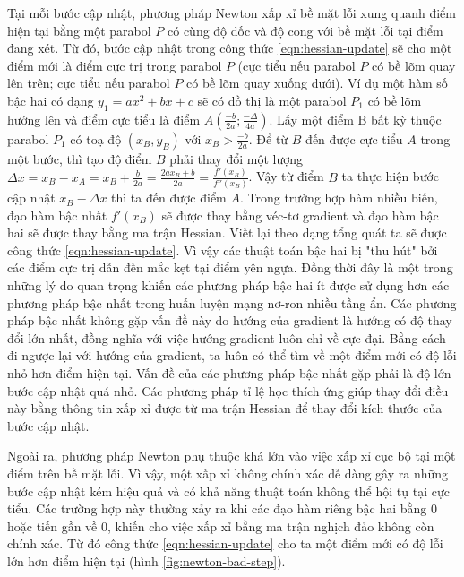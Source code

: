 Tại mỗi bước cập nhật, phương pháp Newton xấp xỉ bề mặt lỗi xung quanh điểm hiện tại bằng một parabol $P$ có cùng độ dốc và độ cong với bề mặt lỗi tại điểm đang xét. Từ đó, bước cập nhật trong công thức \ref{eqn:hessian-update} sẽ cho một điểm mới là điểm cực trị trong parabol $P$ (cực tiểu nếu parabol $P$ có bề lõm quay lên trên; cực tiểu nếu parabol $P$ có bề lõm quay xuống dưới). Ví dụ một hàm số bậc hai có dạng $y_1 = ax^2 + bx + c$ sẽ có đồ thị là một parabol $P_1$ có bề lõm hướng lên và điểm cực tiểu là điểm $A(\frac{-b}{2a};\frac{-\Delta}{4a})$. Lấy một điểm B bất kỳ thuộc parabol $P_1$ có toạ độ $(x_B,y_B)$ với $x_B > \frac{-b}{2a}$. Để từ $B$ đến được cực tiểu $A$ trong một bước, thì tạo độ điểm $B$ phải thay đổi một lượng $\Delta x = x_B - x_A = x_B + \frac{b}{2a} = \frac{2ax_B + b}{2a} = \frac{f'(x_B)}{f''(x_B)}$. Vậy từ điểm $B$ ta thực hiện bước cập nhật $x_B - \Delta x$ thì ta đến được điểm $A$. Trong trường hợp hàm nhiều biến, đạo hàm bậc nhất $f'(x_B)$ sẽ được thay bằng véc-tơ gradient và đạo hàm bậc hai sẽ được thay bằng ma trận Hessian. Viết lại theo dạng tổng quát ta sẽ được công thức \ref{eqn:hessian-update}. Vì vậy các thuật toán bậc hai bị "thu hút" bởi các điểm cực trị dẫn đến mắc kẹt tại điểm yên ngựa. Đồng thời đây là một trong những lý do quan trọng khiến các phương pháp bậc hai ít được sử dụng hơn các phương pháp bậc nhất trong huấn luyện mạng nơ-ron nhiều tầng ẩn. Các phương pháp bậc nhất không gặp vấn đề này do hướng của gradient là hướng có độ thay đổi lớn nhất, đồng nghĩa với việc hướng gradient luôn chỉ về cực đại. Bằng cách đi ngược lại với hướng của gradient, ta luôn có thể tìm về một điểm mới có độ lỗi nhỏ hơn điểm hiện tại. Vấn đề của các phương pháp bậc nhất gặp phải là độ lớn bước cập nhật quá nhỏ. Các phương pháp tỉ lệ học thích ứng giúp thay đổi điều này bằng thông tin xấp xỉ được từ ma trận Hessian để thay đổi kích thước của bước cập nhật.

Ngoài ra, phương pháp Newton phụ thuộc khá lớn vào việc xấp xỉ cục bộ tại một điểm trên bề mặt lỗi. Vì vậy, một xấp xỉ không chính xác dễ dàng gây ra những bước cập nhật kém hiệu quả và có khả năng thuật toán không thể hội tụ tại cực tiểu. Các trường hợp này thường xảy ra khi các đạo hàm riêng bậc hai bằng 0 hoặc tiến gần về 0, khiến cho việc xấp xỉ bằng ma trận nghịch đảo không còn chính xác. Từ đó công thức \ref{eqn:hessian-update} cho ta một điểm mới có độ lỗi lớn hơn điểm hiện tại (hình \ref{fig:newton-bad-step}).

